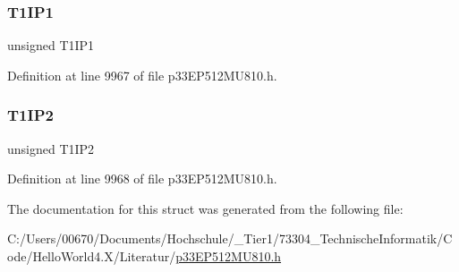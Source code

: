 \subsubsection{\texorpdfstring{T1\+I\+P1}{T1IP1}}
{\footnotesize\ttfamily unsigned T1\+I\+P1}



Definition at line 9967 of file p33\+E\+P512\+M\+U810.\+h.

\mbox{\label{structtag_i_p_c0_b_i_t_s_a59cd2529c1ae068c54c7f35cadc7c289}} 
\subsubsection{\texorpdfstring{T1\+I\+P2}{T1IP2}}
{\footnotesize\ttfamily unsigned T1\+I\+P2}



Definition at line 9968 of file p33\+E\+P512\+M\+U810.\+h.



The documentation for this struct was generated from the following file\+:\begin{DoxyCompactItemize}
\item 
C\+:/\+Users/00670/\+Documents/\+Hochschule/\+\_\+\+Tier1/73304\+\_\+\+Technische\+Informatik/\+Code/\+Hello\+World4.\+X/\+Literatur/\hyperlink{p33_e_p512_m_u810_8h}{p33\+E\+P512\+M\+U810.\+h}\end{DoxyCompactItemize}
